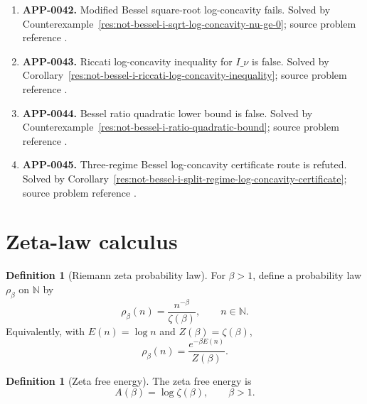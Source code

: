\documentclass[11pt]{article}
\numberwithin{equation}{section}
\theoremstyle{definition}
\newtheorem{definition}[theorem]{Definition}
\theoremstyle{remark}
\newcommand{\N}{\mathbb N}
\newcommand{\1}{\mathbf 1}
\begin{document}
\begin{enumerate}
\item \label{ledger:app-0042}\textbf{APP-0042.} Modified Bessel square-root log-concavity fails. Solved by Counterexample~\ref{res:not-bessel-i-sqrt-log-concavity-nu-ge-0}; source problem reference \cite{app-app-0042-source}.
\item \label{ledger:app-0043}\textbf{APP-0043.} Riccati log-concavity inequality for \(I\_\nu\) is false. Solved by Corollary~\ref{res:not-bessel-i-riccati-log-concavity-inequality}; source problem reference \cite{app-app-0042-source}.
\item \label{ledger:app-0044}\textbf{APP-0044.} Bessel ratio quadratic lower bound is false. Solved by Counterexample~\ref{res:not-bessel-i-ratio-quadratic-bound}; source problem reference \cite{app-app-0042-source}.
\item \label{ledger:app-0045}\textbf{APP-0045.} Three-regime Bessel log-concavity certificate route is refuted. Solved by Corollary~\ref{res:not-bessel-i-split-regime-log-concavity-certificate}; source problem reference \cite{app-app-0042-source}.
\end{enumerate}

\section{Zeta-law calculus}

\begin{definition}[Riemann zeta probability law]
\label{def:zeta-law}
For \(\beta>1\), define a probability law \(\rho_\beta\) on \(\N\) by
\begin{equation}
\label{eq:zeta-law}
\rho_\beta(n)=\frac{n^{-\beta}}{\zeta(\beta)},\qquad n\in\N.
\end{equation}
Equivalently, with \(E(n)=\log n\) and \(Z(\beta)=\zeta(\beta)\),
\begin{equation}
\label{eq:gibbs-form}
\rho_\beta(n)=\frac{e^{-\beta E(n)}}{Z(\beta)}.
\end{equation}
\end{definition}

\begin{definition}[Zeta free energy]
\label{def:zeta-free-energy}
The zeta free energy is
\begin{equation}
\label{eq:zeta-free-energy}
A(\beta)=\log\zeta(\beta),\qquad \beta>1.
\end{equation}
\end{definition}
\end{document}
